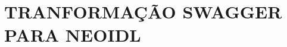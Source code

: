 \chapter{TRANFORMAÇÃO SWAGGER PARA NEOIDL}
\label{scriptSwagger2NeoIDL}

\begin{small}
\scriptsize

\end{small}